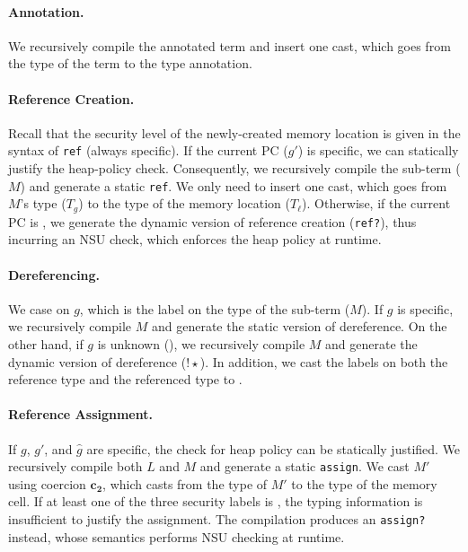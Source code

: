 {\paragraph{Annotation.}
We recursively compile the annotated term and insert one cast, which goes from
the type of the term to the type annotation.

\paragraph{Reference Creation.}
Recall that the security level of the newly-created memory location is given in
the syntax of \texttt{ref} (always specific). If the current PC ($g'$) is
specific, we can statically justify the heap-policy check. Consequently, we
recursively compile the sub-term ($M$) and generate a static \texttt{ref}. We
only need to insert one cast, which goes from $M$'s type ($T_g$) to the type of
the memory location ($T_{\ell}$). Otherwise, if the current PC is \unk, we
generate the dynamic version of reference creation (\texttt{ref?}), thus
incurring an NSU check, which enforces the heap policy at runtime.

\paragraph{Dereferencing.}
We case on $g$, which is the label on the type of the sub-term ($M$). If $g$ is
specific, we recursively compile $M$ and generate the static version of
dereference. On the other hand, if $g$ is unknown (\unk), we recursively compile
$M$ and generate the dynamic version of dereference ($\mathtt{!}{\star}$). In
addition, we cast the labels on both the reference type and the referenced type
to \unk.

\paragraph{Reference Assignment.}
If $g$, $g'$, and $\hat{g}$ are specific, the check for heap policy can be
statically justified. We recursively compile both $L$ and $M$ and generate a
static \texttt{assign}. We cast $M'$ using coercion $\bm{c_2}$, which casts from
the type of $M'$ to the type of the memory cell. If at least one of the three
security labels is \unk, the typing information is insufficient to justify the
assignment. The compilation produces an \texttt{assign?} instead, whose
semantics performs NSU checking at runtime.

} %
